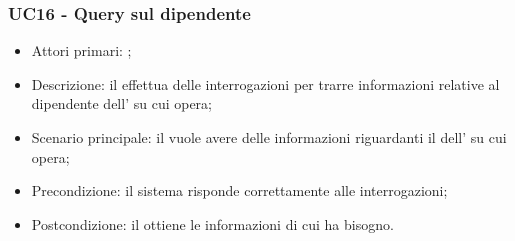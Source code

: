\documentclass[../analisi-dei-requisiti]{subfiles}
\begin{document}
\subsubsection{UC16 - Query sul dipendente}
\label{subsub:UC16}

\begin{itemize}
\item Attori primari: ;
\item Descrizione: il  effettua delle interrogazioni per trarre informazioni relative al dipendente dell' su cui opera;
\item Scenario principale: il  vuole avere delle informazioni riguardanti il dell' su cui opera;
\item Precondizione: il sistema risponde correttamente alle interrogazioni;
\item Postcondizione: il  ottiene le informazioni di cui ha bisogno.

\end{itemize}



\end{document}
